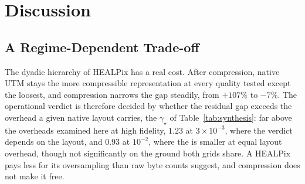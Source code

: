 \section{Discussion}

\subsection{A Regime-Dependent Trade-off}
The dyadic hierarchy of HEALPix has a real cost. After compression,
native UTM stays the more compressible representation at every quality
tested except the loosest, and compression
narrows the gap steadily, from $+107\%$ to $-7\%$. The operational
verdict is therefore decided by whether the residual gap exceeds the
overhead a given native layout carries, the 
$\gamma_\star$ of Table~\ref{tab:synthesis}: far above the overheads
examined here at high fidelity, $1.23$ at
$3\times10^{-3}$, where the verdict depends on the layout, and $0.93$ at
$10^{-2}$, where the  is smaller at equal layout overhead,
though not significantly on the ground both grids share. A
HEALPix  pays less for its oversampling than raw byte counts
suggest, and compression does not make it free.

